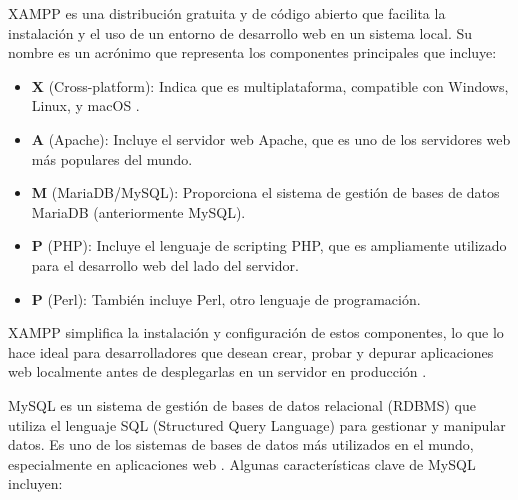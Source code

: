 
\begin{comment}
Esta parte de la memoria tiene como objetivo presentar las técnicas metodológicas y las herramientas de desarrollo que se han utilizado para llevar a cabo el proyecto. Si se han estudiado diferentes alternativas de metodologías, herramientas, bibliotecas se puede hacer un resumen de los aspectos más destacados de cada alternativa, incluyendo comparativas entre las distintas opciones y una justificación de las elecciones realizadas. 
No se pretende que este apartado se convierta en un capítulo de un libro dedicado a cada una de las alternativas, sino comentar los aspectos más destacados de cada opción, con un repaso somero a los fundamentos esenciales y referencias bibliográficas para que el lector pueda ampliar su conocimiento sobre el tema.
\end{comment}

XAMPP es una distribución gratuita y de código abierto que facilita la instalación y el uso de un entorno de desarrollo web en un sistema local. Su nombre es un acrónimo que representa los componentes principales que incluye: 

\begin{itemize}
    \item \textbf{X} (Cross-platform): Indica que es multiplataforma, compatible con Windows, Linux, y macOS \cite{xampp}.
    \item \textbf{A} (Apache): Incluye el servidor web Apache, que es uno de los servidores web más populares del mundo.
    \item \textbf{M} (MariaDB/MySQL): Proporciona el sistema de gestión de bases de datos MariaDB (anteriormente MySQL).
    \item \textbf{P} (PHP): Incluye el lenguaje de scripting PHP, que es ampliamente utilizado para el desarrollo web del lado del servidor.
    \item \textbf{P} (Perl): También incluye Perl, otro lenguaje de programación.
\end{itemize}

XAMPP simplifica la instalación y configuración de estos componentes, lo que lo hace ideal para desarrolladores que desean crear, probar y depurar aplicaciones web localmente antes de desplegarlas en un servidor en producción \cite{xamppdocs}.

MySQL es un sistema de gestión de bases de datos relacional (RDBMS) que utiliza el lenguaje SQL (Structured Query Language) para gestionar y manipular datos. Es uno de los sistemas de bases de datos más utilizados en el mundo, especialmente en aplicaciones web \cite{mysql}. Algunas características clave de MySQL incluyen:

